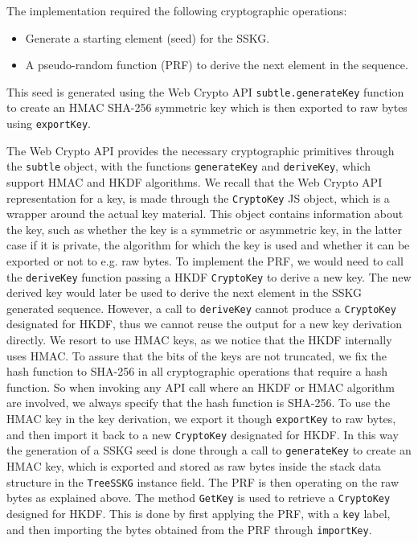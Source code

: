 The implementation required the following cryptographic operations:
\begin{itemize}
    \item Generate a starting element (seed) for the SSKG.
    \item A pseudo-random function (PRF) to derive the next element in the sequence. 
\end{itemize}

This seed is generated using the Web Crypto API \texttt{subtle.generateKey} function 
to create an HMAC SHA-256 symmetric key which is then exported to raw bytes using \texttt{exportKey}.

The Web Crypto API provides the necessary cryptographic primitives
through the \texttt{subtle} object, with the functions
\texttt{generateKey} and \texttt{deriveKey},
which support HMAC and HKDF algorithms.
We recall that the Web Crypto API representation for a
key, is made through the \texttt{CryptoKey} JS object,
which is a wrapper around the actual key material.
This object contains information about the key, such as
whether the key is a symmetric or asymmetric key, in the latter
case if it is private, the algorithm for which the key is used
and whether it can be exported or not to e.g. raw bytes.
To implement the PRF, we would need to call the \texttt{deriveKey}
function passing a HKDF \texttt{CryptoKey} to derive a new key.
The new derived key would later be used to derive the next
element in the SSKG generated sequence. However,
a call to \texttt{deriveKey} cannot produce a \texttt{CryptoKey}
designated for HKDF, thus we cannot reuse the output for a new
key derivation directly. We resort to use HMAC keys,
as we notice that the HKDF internally uses HMAC.
To assure that the bits of the keys are not truncated,
we fix the hash function to SHA-256 in all cryptographic
operations that require a hash function.
So when invoking any API call where an HKDF or HMAC algorithm are involved,
we always specify that the hash function is SHA-256.
To use the HMAC key in the key derivation, we export it
though \texttt{exportKey} to raw bytes, and then import it
back to a new \texttt{CryptoKey} designated for HKDF.
In this way the generation of a SSKG seed is done through a call
to \texttt{generateKey} to create an HMAC key, which is exported
and stored as raw bytes inside the stack data structure in the
\texttt{TreeSSKG} instance field. The PRF is then operating on the
raw bytes as explained above. The method \texttt{GetKey}
is used to retrieve a \texttt{CryptoKey} designed for HKDF.
This is done by first applying the PRF, with a \texttt{key}
label, and then importing the bytes obtained from the PRF
through \texttt{importKey}. 

